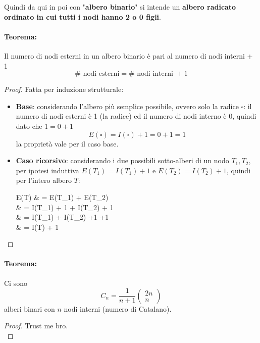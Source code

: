Quindi da qui in poi con "\textbf{albero binario}" si intende un \textbf{albero radicato ordinato in cui tutti i nodi hanno 2 o 0 figli}.\\

\newpage

\paragraph{Teorema:} Il numero di nodi esterni in un albero binario è pari al numero di nodi interni + 1
$$ \# \text{ nodi esterni} = \# \text{ nodi interni } + 1 $$

\begin{proof}
	Fatta per induzione strutturale:
	\begin{itemize}
		\item \textbf{Base}: considerando l'albero più semplice possibile, ovvero solo la radice $\square$: il numero di nodi esterni è 1 (la radice) ed il numero di nodi interno è $0$, quindi dato che $1 = 0 + 1$
		$$ E(\square) = I(\square) + 1 = 0 + 1 = 1 $$
		la proprietà vale per il caso base.\\
		
		\item \textbf{Caso ricorsivo}: considerando i due possibili sotto-alberi di un nodo $T_1, T_2$, per ipotesi induttiva $E(T_1) = I(T_1) + 1$ e $E(T_2) = I(T_2) + 1$, quindi per l'intero albero $T$:
		\begin{flalign*}
			E(T) & = E(T_1) + E(T_2)  \\
			& = I(T_1) + 1 + I(T_2) + 1 \\
			& = I(T_1) + I(T_2) +1 +1 \\
			& = I(T) + 1
		\end{flalign*}
	\end{itemize}
	
\end{proof}

\paragraph{Teorema:} Ci sono 
$$ C_n = \frac{1}{n+1} 
\left(
\begin{array}{c}
	2n \\ n
\end{array}
\right)
$$
alberi binari con $n$ nodi interni (numero di Catalano).\\

\begin{proof}
	Trust me bro.\\
\end{proof}

